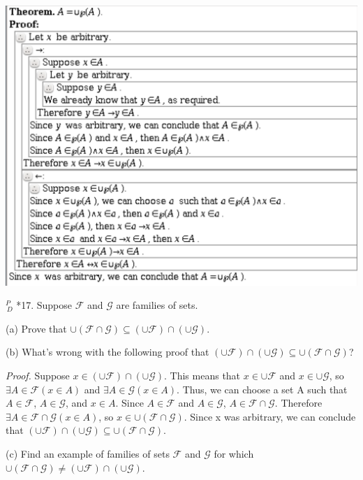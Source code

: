 \documentclass{article}
\begin{document}
\includegraphics[width=\textwidth]{3_4_16}

\vspace{30pt}

$^{\textit{P}}_{\, \textit{D}}$ *17. Suppose $\mathcal{F}$ and $\mathcal{G}$ are families of sets.


\hspace{12pt}(a) Prove that $\cup (\mathcal{F} \cap \mathcal{G}) \subseteq (\cup\mathcal{F}) \cap (\cup\mathcal{G})$.

\hspace{12pt}(b) What's wrong with the following proof that $(\cup \mathcal{F}) \cap (\cup \mathcal{G}) \subseteq
\cup(\mathcal{F} \cap \mathcal{G})$?

\textit{Proof.} Suppose $x \in (\cup\mathcal{F}) \cap (\cup\mathcal{G})$. This means that $x \in \cup \mathcal{F}$ and $x \in \cup \mathcal{G}$, so $\exists A \in \mathcal{F}(x \in A)$ and $\exists A \in \mathcal{G}(x \in A)$. Thus, we can choose a set A such that $A \in \mathcal{F}$, $A \in \mathcal{G}$, and $x \in A$. Since $A \in \mathcal{F}$ and $A \in \mathcal{G}$, $A \in \mathcal{F} \cap \mathcal{G}$. Therefore $\exists A \in \mathcal{F} \cap \mathcal{G}(x \in A)$, so $x \in \cup(\mathcal{F} \cap \mathcal{G})$. Since x was arbitrary, we can conclude that $(\cup\mathcal{F}) \cap (\cup\mathcal{G}) \subseteq \cup(\mathcal{F} \cap \mathcal{G})$.

\hspace{12pt}(c) Find an example of families of sets $\mathcal{F}$ and $\mathcal{G}$ for which $\cup (\mathcal{F} \cap \mathcal{G}) \neq (\cup\mathcal{F}) \cap (\cup\mathcal{G})$.
\vspace{30pt}
\end{document}
